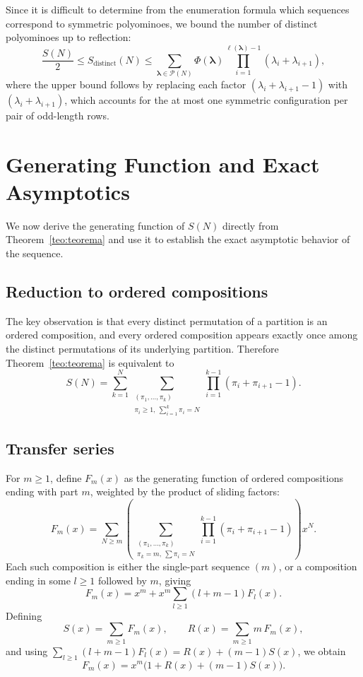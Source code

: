\documentclass{article}
\theoremstyle{definition}
\theoremstyle{plain}
\begin{document}
\noindent Since it is difficult to determine from the enumeration formula 
which sequences correspond to symmetric polyominoes, we bound the number 
of distinct polyominoes up to reflection:
\[
\frac{S(N)}{2} \le S_{\text{distinct}}(N) \le 
\sum_{\boldsymbol{\lambda} \in \mathcal{P}(N)} 
\Phi(\boldsymbol{\lambda}) \prod_{i=1}^{\ell(\boldsymbol{\lambda})-1} 
(\lambda_i + \lambda_{i+1}),
\]
where the upper bound follows by replacing each factor 
$(\lambda_i + \lambda_{i+1} - 1)$ with $(\lambda_i + \lambda_{i+1})$, 
which accounts for the at most one symmetric configuration per pair of 
odd-length rows.

\section{Generating Function and Exact Asymptotics}

We now derive the generating function of $S(N)$ directly from 
Theorem~\ref{teo:teorema} and use it to establish the exact asymptotic 
behavior of the sequence.

\subsection{Reduction to ordered compositions}

The key observation is that every distinct permutation of a partition is 
an ordered composition, and every ordered composition appears exactly once 
among the distinct permutations of its underlying partition. Therefore 
Theorem~\ref{teo:teorema} is equivalent to
\[
S(N) = \sum_{k=1}^{N} \sum_{\substack{(\pi_1,\ldots,\pi_k)\\ 
\pi_i \geq 1,\ \sum_{i=1}^k \pi_i = N}} 
\prod_{i=1}^{k-1}(\pi_i + \pi_{i+1} - 1).
\]

\subsection{Transfer series}

For $m \geq 1$, define $F_m(x)$ as the generating function of ordered 
compositions ending with part $m$, weighted by the product of sliding 
factors:
\[
F_m(x) = \sum_{N \geq m} \left(
\sum_{\substack{(\pi_1,\ldots,\pi_k)\\ 
\pi_k = m,\ \sum \pi_i = N}} 
\prod_{i=1}^{k-1}(\pi_i+\pi_{i+1}-1)
\right) x^N.
\]
Each such composition is either the single-part sequence $(m)$, or a 
composition ending in some $l \geq 1$ followed by $m$, giving
\[
F_m(x) = x^m + x^m \sum_{l \geq 1}(l + m - 1)F_l(x).
\]
Defining
\[
S(x) = \sum_{m \geq 1} F_m(x), \qquad R(x) = \sum_{m \geq 1} m\, F_m(x),
\]
and using $\sum_{l\geq 1}(l+m-1)F_l(x) = R(x) + (m-1)S(x)$, we obtain
\[
F_m(x) = x^m\bigl(1 + R(x) + (m-1)S(x)\bigr). \tag{$*$}
\]
\end{document}
